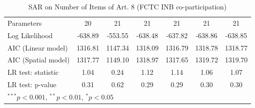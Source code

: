 \begin{table}[!h]
\begin{center}
\begin{tabular}{l c c c c c c }
Parameters              & 20           & 21           & 21           & 21           & 21           & 21           \\
Log Likelihood          & -638.89      & -553.55      & -638.48      & -637.82      & -638.86      & -638.85      \\
AIC (Linear model)      & 1316.81      & 1147.34      & 1318.09      & 1316.79      & 1318.78      & 1318.77      \\
AIC (Spatial model)     & 1317.77      & 1149.10      & 1318.97      & 1317.65      & 1319.72      & 1319.70      \\
LR test: statistic      & 1.04         & 0.24         & 1.12         & 1.14         & 1.06         & 1.07         \\
LR test: p-value        & 0.31         & 0.62         & 0.29         & 0.29         & 0.30         & 0.30         \\
\bottomrule
\multicolumn{7}{l}{\scriptsize{$^{***}p<0.001$, $^{**}p<0.01$, $^*p<0.05$}}
\end{tabular}
\caption{SAR on Number of Items of Art. 8 (FCTC INB co-participation)}
\label{table:coefficients}
\end{center}
\end{table}
